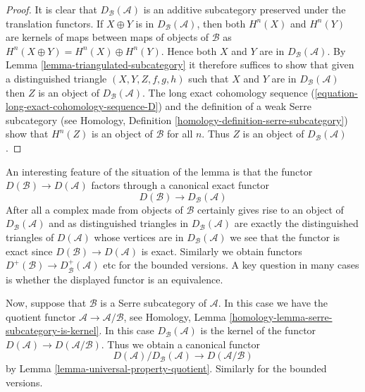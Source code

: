 \begin{proof}
It is clear that $D_\mathcal{B}(\mathcal{A})$ is an additive subcategory
preserved under the translation functors.
If $X \oplus Y$ is in $D_\mathcal{B}(\mathcal{A})$, then
both $H^n(X)$ and $H^n(Y)$ are kernels of maps between maps of objects
of $\mathcal{B}$ as $H^n(X \oplus Y) = H^n(X) \oplus H^n(Y)$.
Hence both $X$ and $Y$ are in $D_\mathcal{B}(\mathcal{A})$. By
Lemma \ref{lemma-triangulated-subcategory}
it therefore suffices to show that given a distinguished triangle
$(X, Y, Z, f, g, h)$ such that $X$ and $Y$ are in $D_\mathcal{B}(\mathcal{A})$
then $Z$ is an object of $D_\mathcal{B}(\mathcal{A})$. The long exact
cohomology sequence (\ref{equation-long-exact-cohomology-sequence-D})
and the definition of a weak Serre subcategory (see
Homology, Definition \ref{homology-definition-serre-subcategory})
show that $H^n(Z)$ is an object of $\mathcal{B}$ for all $n$.
Thus $Z$ is an object of $D_\mathcal{B}(\mathcal{A})$.
\end{proof}

\noindent
An interesting feature of the situation of the lemma is that the
functor $D(\mathcal{B}) \to D(\mathcal{A})$ factors through a canonical
exact functor
\begin{equation}
\label{equation-compare}
D(\mathcal{B}) \longrightarrow D_\mathcal{B}(\mathcal{A})
\end{equation}
After all a complex made from objects of $\mathcal{B}$ certainly
gives rise to an object of $D_\mathcal{B}(\mathcal{A})$ and as
distinguished triangles in $D_\mathcal{B}(\mathcal{A})$ are exactly the
distinguished triangles of $D(\mathcal{A})$ whose vertices are in
$D_\mathcal{B}(\mathcal{A})$ we see that the functor is exact since
$D(\mathcal{B}) \to D(\mathcal{A})$ is exact. Similarly we obtain functors
$D^+(\mathcal{B}) \longrightarrow D^+_\mathcal{B}(\mathcal{A})$ etc
for the bounded versions. A key question in many cases is whether the
displayed functor is an equivalence.

\medskip\noindent
Now, suppose that $\mathcal{B}$ is a Serre subcategory of $\mathcal{A}$.
In this case we have the quotient functor
$\mathcal{A} \to \mathcal{A}/\mathcal{B}$, see
Homology, Lemma \ref{homology-lemma-serre-subcategory-is-kernel}.
In this case $D_\mathcal{B}(\mathcal{A})$ is the kernel of the functor
$D(\mathcal{A}) \to D(\mathcal{A}/\mathcal{B})$.
Thus we obtain a canonical functor
$$
D(\mathcal{A})/D_\mathcal{B}(\mathcal{A})
\longrightarrow
D(\mathcal{A}/\mathcal{B})
$$
by
Lemma \ref{lemma-universal-property-quotient}.
Similarly for the bounded versions.

